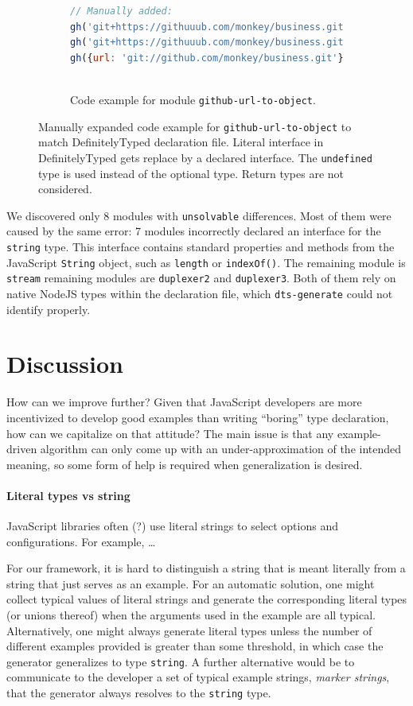 \documentclass[english,cleveref,autoref,submission]{programming}
\begin{document}
\begin{figure}[tp]
\begin{subfigure}{0.80\linewidth}
\begin{lstlisting}[language=JavaScript]
// Manually added:
gh('git+https://githuuub.com/monkey/business.git', {});
gh('git+https://githuuub.com/monkey/business.git', {enterprise: true});
gh({url: 'git://github.com/monkey/business.git'});
      
    \end{lstlisting}
    \caption{Code example for module \texttt{github-url-to-object}.}
    \end{subfigure}
  \caption{Manually expanded code example for \texttt{github-url-to-object} to match DefinitelyTyped declaration file. Literal interface in DefinitelyTyped gets replace by a declared interface. The \texttt{undefined} type is used instead of the optional type. Return types are not considered.}
  \label{fig:experiments-results-manually-completed-examples}
\end{figure}

We discovered only 8 modules with \texttt{unsolvable} differences. Most of them were
caused by the same error: 7 modules incorrectly declared an interface for the
\texttt{string} type. This interface contains standard properties and methods from the
JavaScript \texttt{String} object, such as \texttt{length} or \texttt{indexOf()}. The remaining module is \texttt{stream}
remaining modules are \texttt{duplexer2} and \texttt{duplexer3}. Both of them rely on native
NodeJS types within the declaration file, which \texttt{dts-generate} could not identify
properly.

\section{Discussion}
\label{sec:discussion}

How can we improve further? Given that JavaScript developers are more incentivized to develop good
examples than writing ``boring'' type declaration, how can we capitalize on that attitude?
The main issue is that any example-driven algorithm can only come up with an
under-approximation of the intended meaning, so some form of help is required when
generalization is desired.

\paragraph*{Literal types vs string}
JavaScript libraries often (?) use literal strings to select
options and configurations. For example, \dots

For our framework, it is hard to distinguish a string that is meant literally from a
string that just serves as an example. For an automatic solution, one might collect
typical values of literal strings and generate the corresponding literal types (or
unions thereof) when the arguments used in the example are all typical. Alternatively, one
might always generate literal types unless the number of different examples provided is
greater than some threshold, in which case the generator generalizes to type
\lstinline/string/. A further alternative would be to communicate to the developer a set
of typical example strings, \emph{marker strings}, that the generator always resolves to the \lstinline/string/
type.
\end{document}

